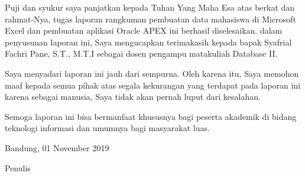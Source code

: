 \begin{acknowledgements}
Puji dan syukur saya panjatkan kepada Tuhan Yang Maha Esa atas berkat dan rahmat-Nya, tugas laporan rangkuman pembuatan data mahasiswa di Microsoft Excel dan pembuatan aplikasi Oracle APEX ini berhasil diselesaikan. dalam penyusunan laporan ini, Saya mengucapkan terimakasih kepada bapak Syafrial Fachri Pane, S.T., M.T.I sebagai dosen pengampu matakuliah Database II.

Saya menyadari laporan ini jauh dari sempurna. Oleh karena itu, Saya memohon maaf kepada semua pihak atas segala kekurangan yang terdapat pada laporan ini karena sebagai manusia, Saya tidak akan pernah luput dari kesalahan. 

Semoga laporan ini bisa bermanfaat khususnya bagi peserta akademik di bidang teknologi informasi dan umumnya bagi masyarakat luas. 


\begin{raggedleft}

Bandung, 01 November 2019

Penulis

\end{raggedleft}

\end{acknowledgements}